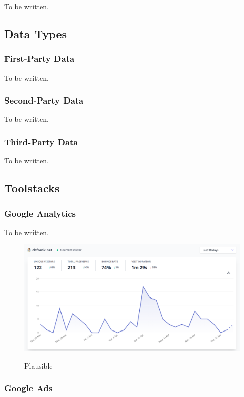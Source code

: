 To be written.

\subsection{Data Types}

\subsubsection{First-Party Data}

To be written.

\subsubsection{Second-Party Data}

To be written.

\subsubsection{Third-Party Data}

To be written.

\subsection{Toolstacks}

\subsubsection{Google Analytics}

To be written.

\begin{figure}[H]
\centering
\caption {Plausible}
\includegraphics[width=\linewidth]{images/plausible.png}
\label{fig:plausible}
\end{figure}

\subsubsection{Google Ads}


